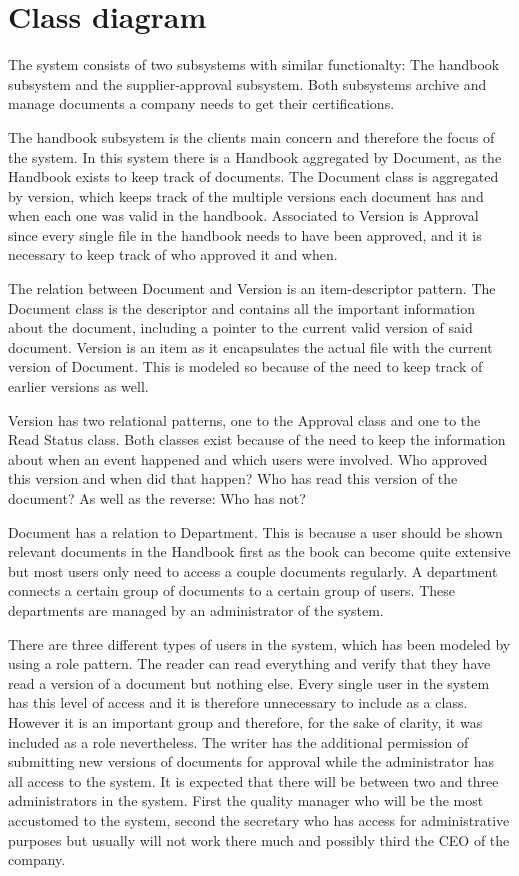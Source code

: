 \section{Class diagram}


The system consists of two subsystems with similar functionalty:
The handbook subsystem and the supplier-approval subsystem.
Both subsystems archive and manage documents a company needs to get their certifications.

The handbook subsystem is the clients main concern and therefore the focus of the system. In this system there is a Handbook aggregated by Document, as the Handbook exists to keep track of documents. The Document class is aggregated by version, which keeps track of the multiple versions each document has and when each one was valid in the handbook. Associated to Version is Approval since every single file in the handbook needs to have been approved, and it is necessary to keep track of who approved it and when.

The relation between Document and Version is an item-descriptor pattern. The Document class is the descriptor and contains all the important information about the document, including a pointer to the current valid version of said document. Version is an item as it encapsulates the actual file with the current version of Document. This is modeled so because of the need to keep track of earlier versions as well.

Version has two relational patterns, one to the Approval class and one to the Read Status class. Both classes exist because of the need to keep the information about when an event happened and which users were involved. Who approved this version and when did that happen? Who has read this version of the document? As well as the reverse: Who has not?

Document has a relation to Department. This is because a user should be shown relevant documents in the Handbook first as the book can become quite extensive but most users only need to access a couple documents regularly. A department connects a certain group of documents to a certain group of users. These departments are managed by an administrator of the system.

There are three different types of users in the system, which has been modeled by using a role pattern. The reader can read everything and verify that they have read a version of a document but nothing else. Every single user in the system has this level of access and it is therefore unnecessary to include as a class. However it is an important group and therefore, for the sake of clarity, it was included as a role nevertheless. The writer has the additional permission of submitting new versions of documents for approval while the administrator has all access to the system. It is expected that there will be between two and three administrators in the system. First the quality manager who will be the most accustomed to the system, second the secretary who has access for administrative purposes but usually will not work there much and possibly third the CEO of the company.


